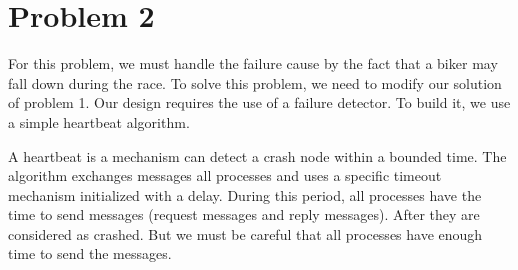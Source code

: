 \documentclass{article}
\begin{document}
\section*{Problem 2}
For this problem, we must handle the failure cause by the fact that a biker may fall down during the race.
To solve this problem, we need to modify our solution of problem 1. Our design requires the use of a 
failure detector. To build it, we use a simple heartbeat algorithm.\newline

A heartbeat is a mechanism can detect a crash node within a bounded time. The algorithm exchanges 
messages all processes and uses a specific timeout mechanism initialized with a delay. During this period,
all processes have the time to send messages (request messages and reply messages). After they are considered 
as crashed. But we must be careful that all processes have enough time to send the messages. 
\end{document}
